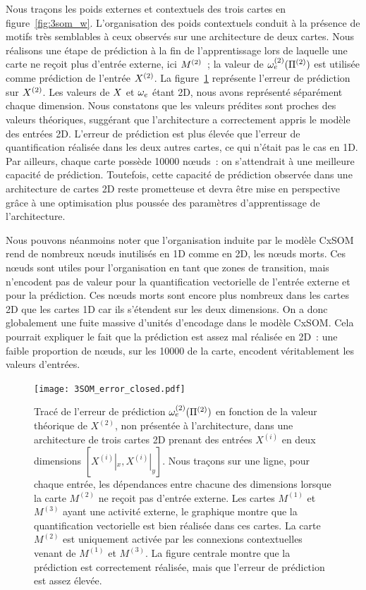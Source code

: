 \documentclass[../main]{subfiles}
\begin{document}
Nous traçons les poids externes et contextuels des trois cartes en figure~\ref{fig:3som_w}.
L'organisation des poids contextuels conduit à la présence de motifs très semblables à ceux observés sur une architecture de deux cartes.
Nous réalisons une étape de prédiction à la fin de l'apprentissage lors de laquelle une carte ne reçoit plus d'entrée externe, ici $M^{({2})}$~; la valeur de $\omega_{e}^{({2})}(\Pi^{({2})})$ est utilisée comme prédiction de l'entrée $X^{({2})}$.
La figure~\ref{fig:3som_pred} représente l'erreur de prédiction sur $X^{({2})}$.
Les valeurs de $X$ et $\omega_e$ étant 2D, nous avons représenté séparément chaque dimension. 
Nous constatons que les valeurs prédites sont proches des valeurs théoriques, suggérant que l'architecture a correctement appris le modèle des entrées 2D.
L'erreur de prédiction est plus élevée que l'erreur de quantification réalisée dans les deux autres cartes, ce qui n'était pas le cas en 1D.
Par ailleurs, chaque carte possède 10000 n\oe{}uds~: on s'attendrait à une meilleure capacité de prédiction. Toutefois, cette capacité de prédiction observée dans une architecture de cartes 2D reste prometteuse et devra être mise en perspective grâce à une optimisation plus poussée des paramètres d'apprentissage de l'architecture.

Nous pouvons néanmoins noter que l'organisation induite par le modèle CxSOM rend de nombreux n\oe{}uds inutilisés en 1D comme en 2D, les n\oe{}uds morts. Ces n\oe{}uds sont utiles pour l'organisation en tant que zones de transition, mais n'encodent pas de valeur pour la quantification vectorielle de l'entrée externe et pour la prédiction. Ces n\oe{}uds morts sont encore plus nombreux dans les cartes 2D que les cartes 1D car ils s'étendent sur les deux dimensions. On a donc globalement une fuite massive d'unités d'encodage dans le modèle CxSOM. 
Cela pourrait expliquer le fait que la prédiction est assez mal réalisée en 2D~: une faible proportion de n\oe{}uds, sur les 10000 de la carte, encodent véritablement les valeurs d'entrées.


\begin{figure}
\centering\texttt{[image: 3SOM\_error\_closed.pdf]}
\caption{Tracé de l'erreur de prédiction $\omega_e^{({2})}(\Pi^{({2})})$ en fonction de la valeur théorique de $X^{(2)}$, non présentée à l'architecture, dans une architecture de trois cartes 2D prenant des entrées $X^{(i)}$ en deux dimensions $[X^{(i)}|_x, X^{(i)}|_y]$. Nous traçons sur une ligne, pour chaque entrée, les dépendances entre chacune des dimensions
lorsque la carte $M^{(2)}$ ne reçoit pas d'entrée externe. Les cartes $M^{(1)}$ et $M^{(3)}$ ayant une activité externe, le graphique montre que la quantification vectorielle est bien réalisée dans ces cartes. La carte $M^{(2)}$ est uniquement activée par les connexions contextuelles venant de $M^{(1)}$ et $M^{(3)}$. La figure centrale montre que la prédiction est correctement réalisée, mais que l'erreur de prédiction est assez élevée. \label{fig:3som_pred}}
\end{figure}
\end{document}
